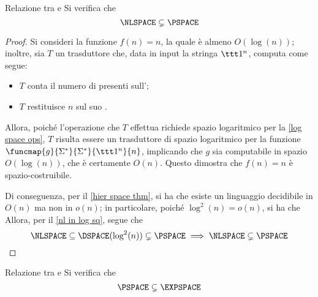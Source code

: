 \documentclass[a4paper, 12pt]{report}
\begin{document}
    \begin{framedprop}[label={nl not in pspace}]{Relazione tra \NLSPACE e \PSPACE}
        Si verifica che $$\NLSPACE \subsetneq \PSPACE$$
    \end{framedprop}

    \begin{proof}
        Si consideri la funzione $f(n) = n$, la quale è almeno $O(\log(n))$; inoltre, sia $T$ un trasduttore che, data in input la stringa $\ttt 1^n$, computa come segue:

        \begin{itemize}
            \item $T$ conta il numero di  presenti sull';
            \item $T$ restituisce $n$ sul suo .
        \end{itemize}

        Allora, poiché l'operazione che $T$ effettua richiede spazio logaritmico per la \cref{log space ops}, $T$ risulta essere un trasduttore di spazio logaritmico per la funzione $\funcmap{g}{\Sigma^*}{\Sigma^*}{\ttt 1^n}{n}$, implicando che $g$ sia computabile in spazio $O(\log(n))$, che è certamente $O(n)$. Questo dimostra che $f(n) = n$ è spazio-costruibile.

        Di conseguenza, per il \cref{hier space thm}, si ha che esiste un linguaggio decidibile in $O(n)$ ma non in $o(n)$; in particolare, poiché $\log^2(n) = o(n)$, si ha che  Allora, per il \cref{nl in log sq}, segue che $$\NLSPACE \subseteq \DSPACE(\log^2(n)) \subsetneq \PSPACE \implies \NLSPACE \subsetneq \PSPACE$$
    \end{proof}

    \begin{framedprop}[label={pspace not in expspace}]{Relazione tra \PSPACE e \EXPSPACE}
        Si verifica che $$\PSPACE \subsetneq \EXPSPACE$$
    \end{framedprop}
\end{document}
